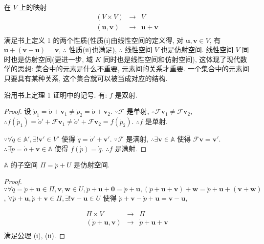 \documentclass{ctexart}
\begin{document}
在 $V$ 上的映射
\[\begin{array}{rcl}
    (V\times V) & \to & V \\
    (\boldsymbol{u},\boldsymbol{v}) & \to & \boldsymbol{u}+\boldsymbol{v} \\
\end{array}\]
满足书上定义 1 的两个性质(性质(i)由线性空间的定义得, 对 $\boldsymbol{u},\boldsymbol{v}\in V$, 有 $\boldsymbol{u}+(\boldsymbol{v}-\boldsymbol{u})=\boldsymbol{v}$, $\therefore$ 性质(ii)也满足), $\therefore$ 线性空间 $V$ 也是仿射空间. 线性空间 $V$ 同时也是仿射空间(更进一步, 域 $K$ 同时也是线性空间和仿射空间), 这体现了现代数学的思想: 集合中的元素是什么不重要, 元素间的关系才重要. 一个集合中的元素间只要具有某种关系, 这个集合就可以被当成对应的结构.
\begin{theorem}
    沿用书上定理 1 证明中的记号. 有: $f$ 是双射.
\end{theorem}
\begin{proof}
    设 $\dot{p}_1=\dot{o}+\boldsymbol{v}_1\neq\dot{p}_2=\dot{o}+\boldsymbol{v}_2$. $\because\mathcal{F}$ 是单射, $\therefore\mathcal{F}\boldsymbol{v}_1\neq\mathcal{F}\boldsymbol{v}_2$, $\therefore f(\dot{p}_1)=\dot{o}'+\mathcal{F}\boldsymbol{v}_1\neq\dot{o}'+\mathcal{F}\boldsymbol{v}_2=f(\dot{p}_2)$. $\therefore f$ 是单射.

    $\because\forall\dot{q}\in\mathbb{A}',\exists!\boldsymbol{v}'\in V'$ 使得 $\dot{q}=\dot{o}'+\boldsymbol{v}'$. $\because\mathcal{F}$ 是满射, $\therefore\exists\boldsymbol{v}\in\mathbb{A}$ 使得 $\mathcal{F}\boldsymbol{v}=\boldsymbol{v}'$. $\therefore\exists\dot{p}=\dot{o}+\boldsymbol{v}\in\mathbb{A}$ 使得 $f(\dot{p})=\dot{q}$. $\therefore f$ 是满射.
\end{proof}
\begin{theorem}[书上的定理 3]
    $\mathbb{A}$ 的子空间 $\varPi=\dot{p}+U$ 是仿射空间.
\end{theorem}
\begin{proof}
    $\because\forall\dot{q}=\dot{p}+\boldsymbol{u}\in\varPi,\boldsymbol{v},\boldsymbol{w}\in U,\dot{p}+\boldsymbol{u}+\boldsymbol{0}=\dot{p}+\boldsymbol{u},(\dot{p}+\boldsymbol{u}+\boldsymbol{v})+\boldsymbol{w}=\dot{p}+\boldsymbol{u}+(\boldsymbol{v}+\boldsymbol{w})$, $\forall\dot{p}+\boldsymbol{u},\dot{p}+\boldsymbol{v}\in\varPi,\exists!\boldsymbol{v}-\boldsymbol{u}\in U$ 使得 $\dot{p}+\boldsymbol{v}-\dot{p}+\boldsymbol{u}=\boldsymbol{v}-\boldsymbol{u}$,

    \[\begin{array}{rcl}
        \varPi\times V & \to & \varPi \\
        (\dot{p}+\boldsymbol{u},\boldsymbol{v}) & \to & \dot{p}+\boldsymbol{u}+\boldsymbol{v} \\
    \end{array}\]
    满足公理 (i), (ii).
\end{proof}
\end{document}
